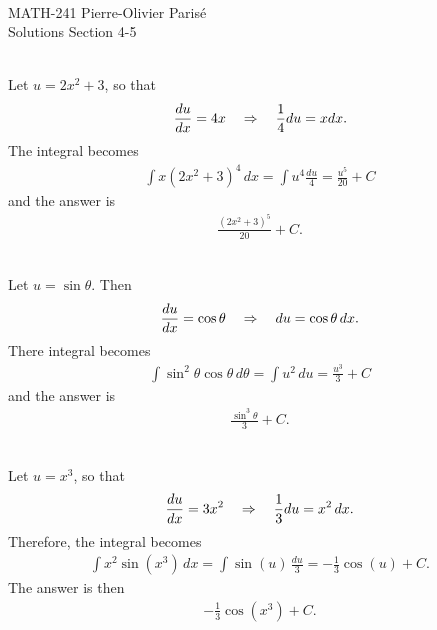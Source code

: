 


	\noindent \hrulefill \\
	MATH-241 \hfill Pierre-Olivier Paris{\'e}\\
	Solutions Section 4-5 \hfill \semester \\\vspace*{-1cm}
	
	\noindent\hrulefill
	
	\spc	
	
	
	\\
	Let $u = 2x^2 + 3$, so that 
		\begin{align*}
		\frac{du}{dx} = 4x \quad \Rightarrow \quad \frac{1}{4} du = x dx .
		\end{align*}
	The integral becomes
		\begin{align*}
		\int x (2x^2 + 3)^4 \, dx = \int u^4 \frac{du}{4} = \frac{u^5}{20} + C
		\end{align*}
	and the answer is
		\begin{align*}
		\frac{(2x^2 + 3)^5}{20} + C .
		\end{align*}
		
	\spc
	
	\\
	Let $u = \sin \theta$. Then
		\begin{align*}
		\frac{du}{dx} = \cos \theta \quad \Rightarrow \quad du = \cos \theta \, dx .
		\end{align*}
	There integral becomes
		\begin{align*}
		\int \sin^2 \theta \cos \theta \, d\theta = \int u^2 \, du = \frac{u^3}{3} + C 
		\end{align*}
	and the answer is
		\begin{align*}
		\frac{\sin^3 \theta}{3} + C .
		\end{align*}
		
	\spc
	
	\\
	Let $u = x^3$, so that 
		\begin{align*}
		\frac{du}{dx} = 3x^2 \quad \Rightarrow \quad \frac{1}{3} du = x^2 \, dx .
		\end{align*}
	Therefore, the integral becomes
		\begin{align*}
		\int x^2 \sin (x^3) \, dx = \int \sin (u) \, \frac{du}{3} = -\tfrac{1}{3} \cos (u) + C .
		\end{align*}
	The answer is then
		\begin{align*}
		-\tfrac{1}{3} \cos (x^3) + C .
		\end{align*}
		
